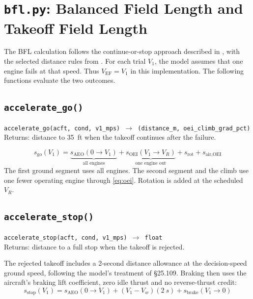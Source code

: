 \documentclass[11pt,letterpaper]{article}
\numberwithin{equation}{section}
\newcommand{\func}[2]{\begin{funcbox}\texttt{#1}\\[2pt]{\color{ink3}Returns:} #2\end{funcbox}}
\newcommand{\code}[1]{\textmd{\texttt{#1}}}
\begin{document}
\section{\code{bfl.py}: Balanced Field Length and Takeoff Field Length}\label{sec:bfl}
The BFL calculation follows the continue-or-stop approach described in \cite{TORENBEEK,MAIR-BIRDSALL,FILIPPONE,AIRBUS-GTG}, with the selected distance rules from \cite[\S\S25.107--25.113]{14CFR25}. For each trial $V_1$, the model assumes that one engine fails at that speed. Thus $V_\text{EF}=V_1$ in this implementation. The following functions evaluate the two outcomes.

\subsection{\code{accelerate\_go()}}
\func{accelerate\_go(acft, cond, v1\_mps) $\rightarrow$ (distance\_m, oei\_climb\_grad\_pct)}{distance to \SI{35}{ft} when the takeoff continues after the failure.}
\begin{equation}
s_\text{go}(V_1) =
\underbrace{s_\text{AEO}(0 \to V_1)}_{\text{all engines}}
+ \underbrace{s_\text{OEI}(V_1 \to V_R)}_{\text{one engine out}}
+ s_\text{rot}
+ s_\text{air,OEI} \label{eq:s-go}
\end{equation}
The first ground segment uses all engines. The second segment and the climb use one fewer operating engine through \eqref{eq:oei}. Rotation is added at the scheduled $V_R$.

\subsection{\code{accelerate\_stop()}}
\func{accelerate\_stop(acft, cond, v1\_mps) $\rightarrow$ float}{distance to a full stop when the takeoff is rejected.}
The rejected takeoff includes a 2-second distance allowance at the decision-speed ground speed, following the model's treatment of \S25.109. Braking then uses the aircraft's braking lift coefficient, zero idle thrust and no reverse-thrust credit:
\begin{equation}
s_\text{stop}(V_1) = s_\text{AEO}(0 \to V_1) + \left(V_1 - V_w\right)(\SI{2}{s}) + s_\text{brake}(V_1 \to 0) \label{eq:s-stop}
\end{equation}
\end{document}
